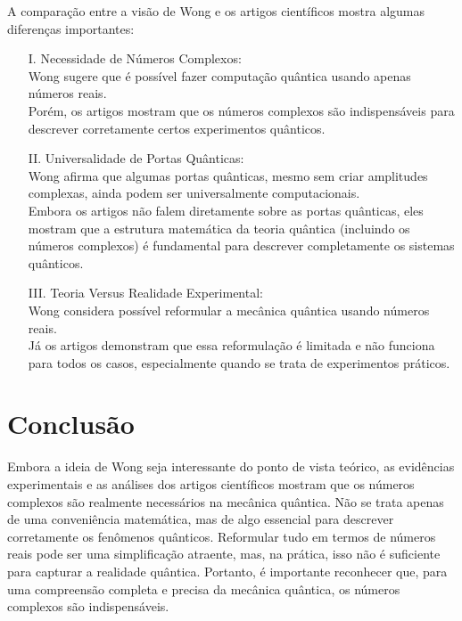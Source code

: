 \documentclass[article]{abntex2}
\begin{document}
A comparação entre a visão de Wong e os artigos científicos mostra algumas diferenças importantes:

\begin{itemize}
    \item[I.] Necessidade de Números Complexos:\\
   Wong sugere que é possível fazer computação quântica usando apenas números reais.\\
   Porém, os artigos mostram que os números complexos são indispensáveis para descrever corretamente certos experimentos quânticos.

\item[II.] Universalidade de Portas Quânticas:\\
   Wong afirma que algumas portas quânticas, mesmo sem criar amplitudes complexas, ainda podem ser universalmente computacionais.\\
   Embora os artigos não falem diretamente sobre as portas quânticas, eles mostram que a estrutura matemática da teoria quântica (incluindo os números complexos) é fundamental para descrever completamente os sistemas quânticos.

\item[III.] Teoria Versus Realidade Experimental:\\
   Wong considera possível reformular a mecânica quântica usando números reais.\\
   Já os artigos demonstram que essa reformulação é limitada e não funciona para todos os casos, especialmente quando se trata de experimentos práticos.
\end{itemize}


\section{Conclusão}
\thispagestyle{plain}

Embora a ideia de Wong seja interessante do ponto de vista teórico, as evidências experimentais e as análises dos artigos científicos mostram que os números complexos são realmente necessários na mecânica quântica. Não se trata apenas de uma conveniência matemática, mas de algo essencial para descrever corretamente os fenômenos quânticos. Reformular tudo em termos de números reais pode ser uma simplificação atraente, mas, na prática, isso não é suficiente para capturar a realidade quântica. Portanto, é importante reconhecer que, para uma compreensão completa e precisa da mecânica quântica, os números complexos são indispensáveis.

\newpage
\thispagestyle{plain}


\vspace{50pt}
\end{document}
